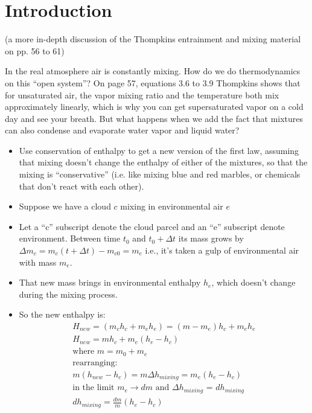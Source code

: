 \documentclass[12pt]{article}
\begin{document}
\newcommand{\vect}[1]{\boldsymbol{\vec{#1}}}
\pagestyle{first}

\section{Introduction}
\label{sec:introduction}

(a more in-depth discussion of the Thompkins entrainment and mixing material on pp. 56 to 61)

In the real atmosphere air is constantly mixing.  How do we do
thermodynamics on this ``open system''?  On page 57, equations 3.6 to
3.9 Thompkins shows that for unsaturated air, the vapor mixing ratio
and the temperature both mix approximately linearly, which is why
you can get supersaturated vapor on a cold day and see your
breath.   But what happens when we add the fact that mixtures can
also condense and evaporate water vapor and liquid water?

  \begin{itemize}
  \item Use conservation of enthalpy to get a new version of the
    first law, assuming that mixing doesn't change the enthalpy of
    either of the mixtures, so that the mixing is ``conservative''
   (i.e. like mixing blue and red marbles, or chemicals that don't
   react with each other).

  \item Suppose we have a cloud $c$ mixing in environmental air $e$


  \item Let a ``c'' subscript denote the cloud parcel and an ``e'' subscript denote
   environment. Between time $t_0$ and $t_0 + \Delta t$ its mass grows by $\Delta m_c =
    m_{c}(t + \Delta t) - m_{c0} = m_e$  i.e., it's taken a gulp of environmental
    air with mass $m_e$.

  \item That new mass brings in environmental enthalpy $h_e$, which
    doesn't change during the mixing process.
  \item So the new enthalpy is:
    \begin{gather}
      H_{new} = (m_{c} h_c + m_e h_e) = (m - m_e)h_c + m_e h_e \nonumber \\
H_{new} = m h_c + m_e (h_e - h_c)\\
\text{where $m=m_0 + m_e$}\\
\text{rearranging: }\nonumber \\
m (h_{new} - h_c) = m \Delta h_{mixing} = m_e (h_e - h_c) \\
\text{in the limit $m_e \rightarrow dm$ and $\Delta h_{mixing}$ = $dh_{mixing}$}\nonumber \\
dh_{mixing} = \frac{ dm}{m} (h_e - h_c) \label{eq:mixh}
    \end{gather}

    \end{itemize}
\end{document}
